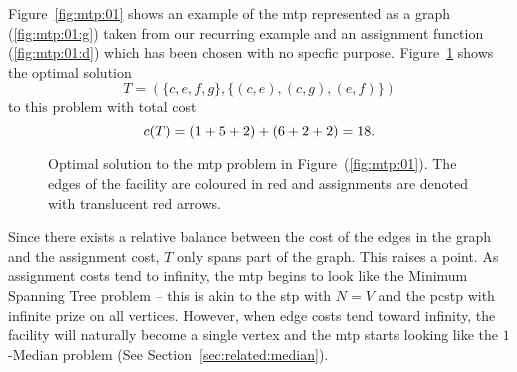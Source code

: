 Figure~\ref{fig:mtp:01} shows an example of the \gls{mtp} represented as a graph
(\ref{fig:mtp:01:g}) taken from our recurring example
and an assignment function (\ref{fig:mtp:01:d}) which has been chosen with
no specfic purpose.
Figure~\ref{fig:mtp:01:opt}
shows the optimal solution
$$T = ( \{ c, e, f, g \}, \{(c, e), (c, g), (e, f)\})$$
to this problem with total cost
$$c(T) = (1 + 5 + 2) + (6 + 2 + 2) = 18\mathnormal{.}$$
\begin{figure}[h!]
  \centering
    \caption{Optimal solution to the \gls{mtp} problem in Figure~(\ref{fig:mtp:01}).
      The edges of the facility are coloured in red and assignments are denoted with translucent red arrows.}\label{fig:mtp:01:opt}
  \end{figure}

  Since there exists a relative balance between the cost of the edges in the graph and the assignment cost, $T$
  only spans part of the graph. This raises a point. As assignment costs tend to infinity, the \gls{mtp} begins to look
  like the Minimum Spanning Tree problem -- this is akin to the \gls{stp} with $N = V$ and the \gls{pcstp} with infinite prize
  on all vertices. However, when edge costs tend toward infinity, the facility will naturally become a single vertex
  and the \gls{mtp} starts looking like the $1$-Median problem (See Section~\ref{sec:related:median}).

